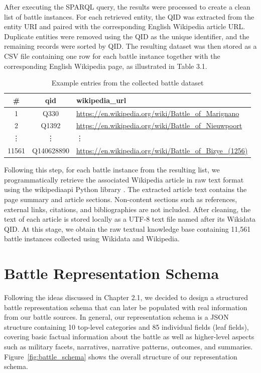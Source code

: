 After executing the SPARQL query, the results were processed to create a clean list of battle instances. For each retrieved entity, the QID was extracted from the entity URI and paired with the corresponding English Wikipedia article URL. Duplicate entities were removed using the QID as the unique identifier, and the remaining records were sorted by QID. The resulting dataset was then stored as a CSV file containing one row for each battle instance together with the corresponding English Wikipedia page, as illustrated in Table 3.1.
\begin{table}[htbp]
    \centering
    \caption{Example entries from the collected battle dataset}
    \label{tab:battle_dataset}
    \begin{tabular}{c c l}
        \toprule
        \textbf{\#} & \textbf{qid} & \textbf{wikipedia\_url} \\
        \midrule
        1 & Q330 & \url{https://en.wikipedia.org/wiki/Battle_of_Marignano} \\
        2 & Q1392 & \url{https://en.wikipedia.org/wiki/Battle_of_Nieuwpoort} \\
        \vdots & \vdots & \vdots \\
        11561 & Q140628890 & \url{https://en.wikipedia.org/wiki/Battle_of_Bizye_(1256)} \\
        \bottomrule
    \end{tabular}
\end{table}

Following this step, for each battle instance from the resulting list, we programmatically retrieve the associated Wikipedia article in raw text format using the wikipediaapi Python library \citep{wikipediaapi}. The extracted article text contains the page summary and article sections. Non-content sections such as references, external links, citations, and bibliographies are not included. After cleaning, the text of each article is stored locally as a UTF-8 text file named after its Wikidata QID. At this stage, we obtain the raw textual knowledge base containing 11,561 battle instances collected using Wikidata and Wikipedia.
\section{Battle Representation Schema}
Following the ideas discussed in Chapter 2.1, we decided to design a structured battle representation schema that can later be populated with real information from our battle sources. In general, our representation schema is a JSON structure containing 10 top-level categories and 85 individual fields (leaf fields), covering basic factual information about the battle as well as higher-level aspects such as military facets, narratives, narrative patterns, outcomes, and summaries. Figure~\ref{fig:battle_schema} shows the overall structure of our representation schema.

